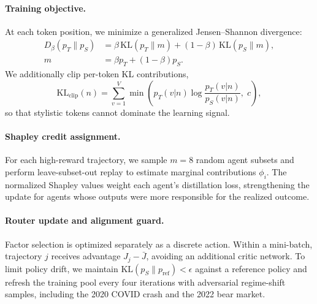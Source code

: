\paragraph{Training objective.}
At each token position, we minimize a generalized Jensen--Shannon divergence:
\begin{equation}
\begin{split}
D_\beta(p_T \| p_S) &= \beta\,\mathrm{KL}(p_T\|m)
 +(1{-}\beta)\,\mathrm{KL}(p_S\|m),\\
m &= \beta p_T+(1{-}\beta)p_S.
\end{split}
\end{equation}
We additionally clip per-token KL contributions,
\begin{equation}
\mathrm{KL}_{\mathrm{clip}}(n)=\sum_{v=1}^{V}
\min\left(p_T(v|n)\log\frac{p_T(v|n)}{p_S(v|n)},\;c\right),
\end{equation}
so that stylistic tokens cannot dominate the learning signal.

\paragraph{Shapley credit assignment.}
For each high-reward trajectory, we sample $m{=}8$ random agent subsets and perform leave-subset-out replay to estimate marginal contributions $\phi_i$. The normalized Shapley values weight each agent's distillation loss, strengthening the update for agents whose outputs were more responsible for the realized outcome.

\paragraph{Router update and alignment guard.}
Factor selection is optimized separately as a discrete action. Within a mini-batch, trajectory $j$ receives advantage $J_j-\bar{J}$, avoiding an additional critic network. To limit policy drift, we maintain $\mathrm{KL}(p_S\|p_{\mathrm{ref}})<\epsilon$ against a reference policy and refresh the training pool every four iterations with adversarial regime-shift samples, including the 2020 COVID crash and the 2022 bear market.

